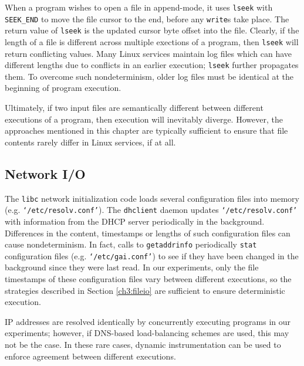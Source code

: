 When a program wishes to open
a file in append-mode, it uses \texttt{lseek}
with \texttt{SEEK\_END} to move
the file cursor to the end,
before any \texttt{write}s take place.
The return value of \texttt{lseek} is the
updated cursor byte offset into the file.
Clearly, if the length of a file is different across
multiple exections of a program, then
\texttt{lseek} will return conflicting values.
Many Linux services maintain log files
which can have different lengths due
to conflicts in an earlier execution; \texttt{lseek}
further propagates them. To overcome
such nondeterminism, older log files
must be identical at the beginning 
of program execution.

Ultimately, if two input files are semantically different between
different executions of a program, then 
execution will inevitably diverge. However,
the approaches mentioned in this chapter
are typically sufficient to ensure that
file contents rarely differ in Linux services,
if at all.

\subsection{Network I/O} \label{ch3:netio}
The \texttt{libc} network initialization
code loads several configuration files
into memory (e.g. \texttt{`/etc/resolv.conf'}). 
The \texttt{dhclient} daemon updates \texttt{`/etc/resolv.conf'} 
with information from the DHCP server periodically in the background.
Differences in
the content, timestamps or lengths
of such configuration files can cause nondeterminism.
In fact, calls to \texttt{getaddrinfo} 
periodically \texttt{stat} configuration files (e.g. \texttt{`/etc/gai.conf'})
to see if they have been changed in the background since they were last read. 
In our experiments, only the file timestamps of these configuration files vary
between different executions, so the strategies described in Section \ref{ch3:fileio} 
are sufficient to ensure deterministic execution. 

IP addresses are resolved identically by concurrently executing programs 
in our experiments; however, if DNS-based
load-balancing schemes are used, this may not be the case.
In these rare cases, dynamic instrumentation can be used
to enforce agreement between different executions.


